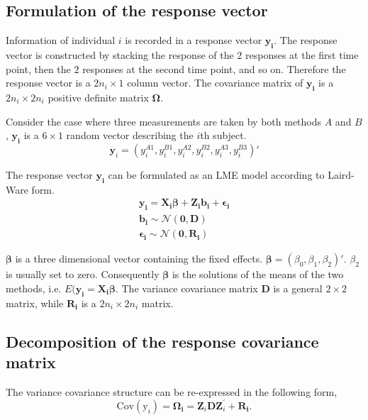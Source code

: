 \documentclass[12pt, a4paper]{report}
\theoremstyle{plain}
\theoremstyle{definition}
\theoremstyle{remark}
\begin{document}
\newpage
\subsection{Formulation of the response vector}
Information of individual $i$ is recorded in a response vector $\boldsymbol{y_{i}}$. The response vector is constructed by stacking the response of the $2$ responses at the first time point, then the $2$ responses at the second time point, and so on. Therefore the response vector is a $2n_{i} \times 1$ column vector.
The covariance matrix of $\boldsymbol{y_{i}}$ is a $2n_{i} \times 2n_{i}$ positive definite matrix $\boldsymbol{\Omega}$.

Consider the case where three measurements are taken by both methods $A$ and $B$, $\boldsymbol{y_{i}}$ is a $6 \times 1$ random vector describing the $i$th subject.
\begin{equation}
\boldsymbol{y}_{i} = (y_{i}^{A1},y_{i}^{B1},y_{i}^{A2},y_{i}^{B2},y_{i}^{A3},y_{i}^{B3}) \prime
\end{equation}

The response vector $\boldsymbol{y_{i}}$ can be formulated as an LME model according to Laird-Ware form.
\begin{eqnarray}
\boldsymbol{y_{i}} = \boldsymbol{X_{i}\beta}  + \boldsymbol{Z_{i}b_{i}} + \boldsymbol{\epsilon_{i}}\\
\boldsymbol{b_{i}} \sim \mathcal{N}(\boldsymbol{0,D})\\
\boldsymbol{\epsilon_{i}} \sim \mathcal{N}(\boldsymbol{0,R_{i}})
\end{eqnarray}

$\boldsymbol{\beta}$ is a three dimensional vector containing the fixed effects. $\boldsymbol{\beta} = (\beta_{0},\beta_{1},\beta_{2})\prime$. $\beta_{2}$ is usually set to zero. Consequently $\boldsymbol{\beta}$ is the solutions of the means of the two methods, i.e. $E(\boldsymbol{y_{i}}  = \boldsymbol{X_{i}\beta}$. The variance covariance matrix $\boldsymbol{D}$ is a general $2 \times 2$ matrix, while $\boldsymbol{R_{i}}$ is a $2n_{i} \times 2n_{i}$ matrix.

\newpage
\subsection{Decomposition of the response covariance matrix}
The variance covariance structure can be re-expressed in the following form,
\[
\mbox{Cov}(\mbox{y}_{i}) = \boldsymbol{\Omega_{i}} = \boldsymbol{Z}_{i}\boldsymbol{D}\boldsymbol{Z}_{i}^\prime + \boldsymbol{R_{i}}.
\]
\end{document}
